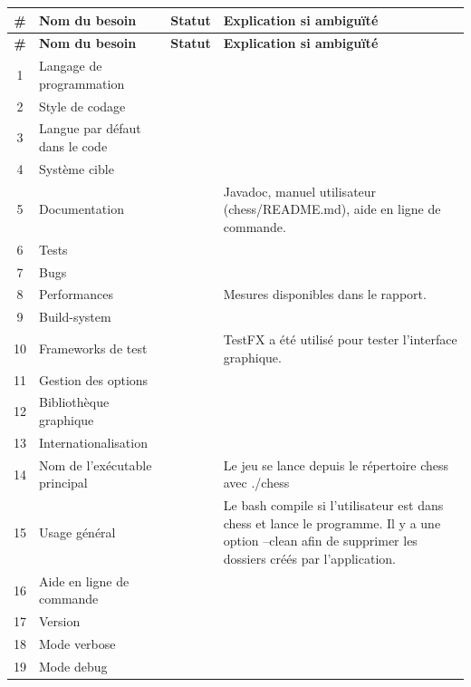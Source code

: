 \documentclass{article}
\newcommand{\valid}{\textcolor{green}{\ding{108}}}  %
\begin{document}
\begin{longtable}{|c|p{5cm}|c|p{5cm}|}
    \hline
    \textbf{\#} & \textbf{Nom du besoin} & \textbf{Statut} & \textbf{Explication si ambiguïté} \\
    \hline
    \endfirsthead

    \hline
    \textbf{\#} & \textbf{Nom du besoin} & \textbf{Statut} & \textbf{Explication si ambiguïté} \\
    \hline
    \endhead

    \hline
    1 & Langage de programmation & \valid & \\
    \hline
    2 & Style de codage & \valid & \\
    \hline
    3 & Langue par défaut dans le code & \valid & \\
    \hline
    4 & Système cible & \valid & \\
    \hline
    5 & Documentation & \valid & Javadoc, manuel utilisateur (chess/README.md), aide en ligne de commande. \\
    \hline
    6 & Tests & \valid & \\
    \hline
    7 & Bugs & \valid & \\
    \hline
    8 & Performances & \valid & Mesures disponibles dans le rapport. \\
    \hline
    9 & Build-system & \valid & \\
    \hline
    10 & Frameworks de test & \valid & TestFX a été utilisé pour tester l'interface graphique. \\
    \hline
    11 & Gestion des options & \valid & \\
    \hline
    12 & Bibliothèque graphique & \valid & \\
    \hline
    13 & Internationalisation & \valid & \\
    \hline
    14 & Nom de l’exécutable principal & \valid & Le jeu se lance depuis le répertoire chess avec ./chess\\
    \hline
    15 & Usage général & \valid & Le bash compile si l'utilisateur est dans chess et lance le programme. Il y a une option --clean afin de supprimer les dossiers créés par l'application. \\
    \hline
    16 & Aide en ligne de commande & \valid & \\
    \hline
    17 & Version & \valid & \\
    \hline
    18 & Mode verbose & \valid & \\
    \hline
    19 & Mode debug & \valid & \\

\end{longtable}
\end{document}
